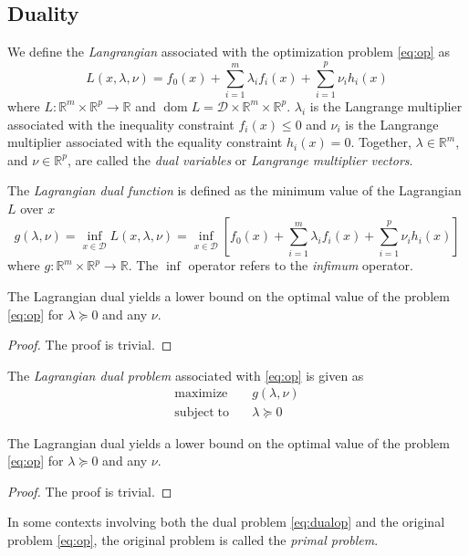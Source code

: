 \subsection{Duality}
We define the \emph{Langrangian} associated with the optimization problem \eqref{eq:op} as
\begin{equation}
L(x, \lambda, \nu) = f_0(x) + \sum_{i=1}^m \lambda_i f_i(x)
+ \sum_{i=1}^p \nu_i h_i(x)
\end{equation}
where $L: \mathbb{R}^m \times \mathbb{R}^p \rightarrow \mathbb{R}$ and $\operatorname{dom} L = \mathcal{D} \times \mathbb{R}^m \times \mathbb{R}^p$. $\lambda_i$ is the Langrange multiplier associated with the inequality constraint $f_i(x) \leq 0$ and $\nu_i$ is the Langrange multiplier associated with the equality constraint $h_i(x) = 0$. Together, $\lambda \in \mathbb{R}^m$, and $\nu \in \mathbb{R}^p$, are called the \emph{dual variables} or \emph{Langrange multiplier vectors}.

The \emph{Lagrangian dual function} is defined as the minimum value of the Lagrangian $L$ over $x$
\begin{equation}
g(\lambda, \nu) = \inf_{x \in \mathcal{D}} L(x, \lambda, \nu)
= \inf_{x \in \mathcal{D}} \left[ f_0(x) + \sum_{i=1}^m \lambda_i f_i(x)
+ \sum_{i=1}^p \nu_i h_i(x) \right]
\end{equation}
where $g: \mathbb{R}^m \times \mathbb{R}^p \rightarrow \mathbb{R}$. The $\inf$ operator refers to the \emph{infimum} operator.

\begin{theorem}
  The Lagrangian dual yields a lower bound on the optimal value of the problem \eqref{eq:op} for $\lambda \succeq 0$ and any $\nu$.
\end{theorem}
\begin{proof}
  The proof is trivial.
\end{proof}

The \emph{Lagrangian dual problem} associated with \eqref{eq:op} is given as
\begin{align} \label{eq:dualop}
\mathrm{maximize}    \quad & g(\lambda, \nu) \nonumber \\
\mathrm{subject\;to} \quad & \lambda \succeq 0
\end{align}

\begin{theorem}
  The Lagrangian dual yields a lower bound on the optimal value of the problem \eqref{eq:op} for $\lambda \succeq 0$ and any $\nu$.
\end{theorem}
\begin{proof}
  The proof is trivial.
\end{proof}
In some contexts involving both the dual problem \eqref{eq:dualop} and the original problem \eqref{eq:op}, the original problem is called the \emph{primal problem}.

